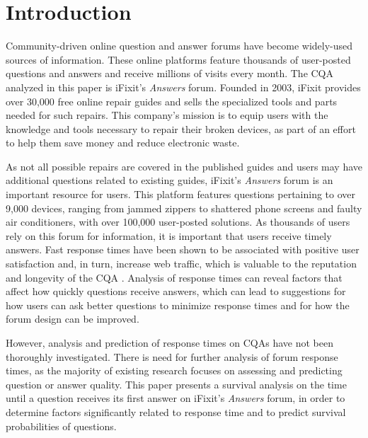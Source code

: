 \documentclass[preprint]{elsarticle}\usepackage[]{graphicx}\usepackage[]{color}
\begin{document}

\section{Introduction}

Community-driven online question and answer forums have become widely-used sources of information. These online platforms feature thousands of user-posted questions and answers and receive millions of visits every month. The CQA analyzed in this paper is iFixit's \textit{Answers} forum. Founded in 2003, iFixit provides over 30,000 free online repair guides and sells the specialized tools and parts needed for such repairs. This company's mission is to equip users with the knowledge and tools necessary to repair their broken devices, as part of an effort to help them save money and reduce electronic waste. 
    
As not all possible repairs are covered in the published guides and users may have additional questions related to existing guides, iFixit's \textit{Answers} forum is an important resource for users. This platform features questions pertaining to over 9,000 devices, ranging from jammed zippers to shattered phone screens and faulty air conditioners, with over 100,000 user-posted solutions. As thousands of users rely on this forum for information, it is important that users receive timely answers. Fast response times have been shown to be associated with positive user satisfaction and, in turn, increase web traffic, which is valuable to the reputation and longevity of the CQA \cite{Rechavi2011}. Analysis of response times can reveal factors that affect how quickly questions receive answers, which can lead to suggestions for how users can ask better questions to minimize response times and for how the forum design can be improved.

However, analysis and prediction of response times on CQAs have not been thoroughly investigated. There is need for further analysis of forum response times, as the majority of existing research focuses on assessing and predicting question or answer quality. This paper presents a survival analysis on the time until a question receives its first answer on iFixit's \textit{Answers} forum, in order to determine factors significantly related to response time and to predict survival probabilities of questions.
\end{document}
